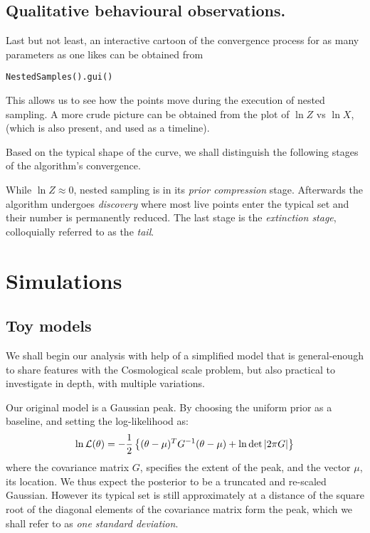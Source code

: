 \documentclass[usenatbib]{mnras}
\begin{document}
\subsection{Qualitative behavioural observations.}
\label{sec:orgc130c1c}
Last but not least, an interactive cartoon of the convergence
process for as many parameters as one likes can be obtained from

\begin{verbatim}
NestedSamples().gui()
\end{verbatim}
This allows us to see how the points move during the execution of
nested sampling. A more crude picture can be obtained from the plot
of \(\ln Z\) vs \(\ln X\), (which is also present, and used as a
timeline).

Based on the typical shape of the curve, we shall distinguish the
following stages of the algorithm's convergence. 

While \(\ln Z \approx 0\), nested sampling is in its \emph{prior
compression} stage.  Afterwards the algorithm undergoes \emph{discovery}
where most live points enter the typical set and their number is
permanently reduced. The last stage is the \emph{extinction stage},
colloquially referred to as the \emph{tail}.


\section{Simulations}
\label{sec:org6c490eb}
\subsection{Toy models}
\label{sec:orgc63439c}

We shall begin our analysis with help of a simplified model that is
general-enough to share features with the Cosmological scale
problem, but also practical to investigate in depth, with multiple
variations.

Our original model is a Gaussian peak. By choosing the uniform prior as a baseline, and setting the log-likelihood as:
\begin{equation}
  \ln {\cal L}(\theta) = - \frac{1}{2} \left\{(\theta - \mu)^{T}G^{-1}(\theta-\mu)  + \ln \det \left| 2\pi G\right| \right\}
\end{equation}
where the covariance matrix \(G\), specifies the extent of the peak,
and the vector \(\mu\), its location. We thus expect the posterior to
be a truncated and re-scaled Gaussian. However its typical set is
still approximately at a distance of the square root of the diagonal elements of the
covariance matrix form the peak, which we shall refer to as \emph{one
standard deviation}.
\end{document}
